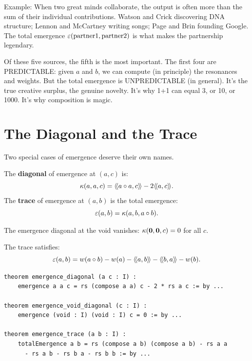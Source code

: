 \begin{interpretation}
Example: When two great minds collaborate, the output is often more than the
sum of their individual contributions. Watson and Crick discovering DNA structure;
Lennon and McCartney writing songs; Page and Brin founding Google. The total
emergence $\varepsilon(\text{partner1}, \text{partner2})$ is what makes the partnership
legendary.

Of these five sources, the fifth is the most important. The first four are
PREDICTABLE: given $a$ and $b$, we can compute (in principle) the resonances
and weights. But the total emergence is UNPREDICTABLE (in general). It's the
true creative surplus, the genuine novelty. It's why 1+1 can equal 3, or 10, or
1000. It's why composition is magic.
\end{interpretation}


\section{The Diagonal and the Trace}

Two special cases of emergence deserve their own names.

\begin{definition}
\label{def:diagonal-trace}
The \textbf{diagonal} of emergence at $(a,c)$ is:
\[
  \kappa(a, a, c) = \langle\!\langle a \circ a, c \rangle\!\rangle - 2\langle\!\langle a, c \rangle\!\rangle.
\]
The \textbf{trace} of emergence at $(a,b)$ is the total emergence:
\[
  \varepsilon(a,b) = \kappa(a, b, a \circ b).
\]
\end{definition}

\begin{theorem}
\label{thm:void-diagonal}
The emergence diagonal at the void vanishes: $\kappa(\mathbf{0}, \mathbf{0}, c) = 0$ for
all $c$.
\end{theorem}

\begin{theorem}
\label{thm:emergence-trace}
The trace satisfies:
\[
  \varepsilon(a,b) = w(a \circ b) - w(a) - \langle\!\langle a, b \rangle\!\rangle - \langle\!\langle b, a \rangle\!\rangle - w(b).
\]
\end{theorem}

\begin{lstlisting}[caption={Diagonal and trace (IDT\_v3\_Emergence.lean)}]
theorem emergence_diagonal (a c : I) :
    emergence a a c = rs (compose a a) c - 2 * rs a c := by ...

theorem emergence_void_diagonal (c : I) :
    emergence (void : I) (void : I) c = 0 := by ...

theorem emergence_trace (a b : I) :
    totalEmergence a b = rs (compose a b) (compose a b) - rs a a
      - rs a b - rs b a - rs b b := by ...
\end{lstlisting}

